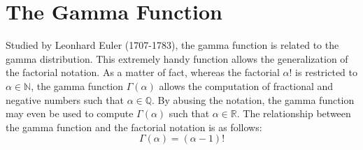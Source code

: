 \documentclass[12pt]{article}
\begin{document}

\pagebreak
\section{The Gamma Function}
\vspace*{-6pt}
Studied by Leonhard Euler (1707-1783), the gamma function is related to the gamma distribution. This extremely handy
function allows the generalization of the factorial notation. As a matter of fact, whereas the factorial $\alpha!$ is
restricted to $\alpha\in\mathbb{N}$, the gamma function $\Gamma(\alpha)$ allows the computation of fractional and
negative numbers such that $\alpha\in\mathbb{Q}$. By abusing the notation, the gamma function may even be used to
compute $\Gamma(\alpha)$ such that $\alpha\in\mathbb{R}$. The relationship between the gamma function and the factorial
notation is as follows:
\vspace*{-18pt}
\begin{equation}\label{eq:gammafunction:factorial}
	\Gamma(\alpha)=(\alpha-1)!
\end{equation}
\vspace*{-60pt}
\end{document}
